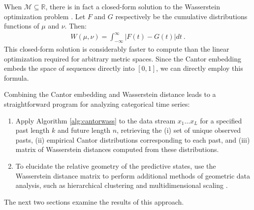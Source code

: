 \documentclass[sigconf, anonymous, review]{acmart}
\begin{document}
When $\mathcal{M} \subseteq \mathbb{R}$, there is in fact a closed-form solution
to the Wasserstein optimization problem \cite{Thas10a}. Let $F$ and $G$
respectively be the cumulative distributions functions of $\mu$ and $\nu$.
Then:
\begin{align*}
  W(\mu,\nu) = \int_{-\infty}^\infty \left|F(t)-G(t)\right| dt
  ~.
\end{align*}
This closed-form solution is considerably faster to compute than the linear
optimization required for arbitrary metric spaces. Since the Cantor embedding
embeds the space of sequences directly into $[0,1]$, we can directly employ
this formula.

Combining the Cantor embedding and Wasserstein distance leads to a
straightforward program for analyzing categorical time series:
\begin{enumerate}
\item Apply Algorithm \ref{alg:cantorwass} to the data stream $x_1\dots x_L$
	for a specified past length $k$ and future length $n$, retrieving the (i)
	set of unique observed pasts, (ii) empirical Cantor distributions
	corresponding to each past, and (iii) matrix of Wasserstein distances
	computed from these distributions.
\item To elucidate the relative geometry of the predictive states, use the
	Wasserstein distance matrix to perform additional methods of geometric data
	analysis, such as hierarchical clustering \cite{Mull11a} and
	multidimensional scaling \cite{Borg05a}.
\end{enumerate}
The next two sections examine the results of this approach.
\end{document}
